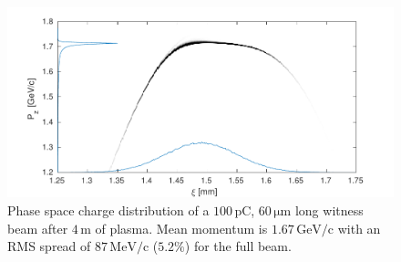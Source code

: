 \documentclass[aps,prstab,reprint,amsmath,amssymb,groupedaddress]{revtex4-1}
\newcommand{\unit}[1]{\,\mathrm{#1}}
\begin{document}
\begin{figure}[hbt]
    \includegraphics[width=\linewidth,trim={2mm 0mm 2mm 0mm},clip]{figures/beamPhaseSpace}
    \caption{\label{Fig:BeamPS} Phase space charge distribution of a $100\unit{pC}$, $60\unit{\mu m}$ long witness beam
        after $4\unit{m}$ of plasma. Mean momentum is $1.67\unit{GeV/c}$ with an RMS spread of $87\unit{MeV/c}$
        ($5.2\%$) for the full beam.}
\end{figure}
\end{document}
